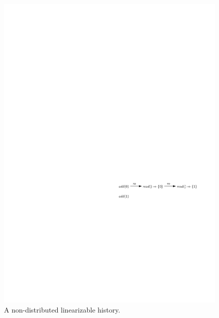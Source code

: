 \begin{figure}[t]
  \centering
  \includegraphics[width=0.6 \textwidth]{figures/PIC-Example-NonLinHis.pdf}
  \caption{A non-distributed linearizable history.}
  \label{fig:a non-distributed linearizable history}
\end{figure}


